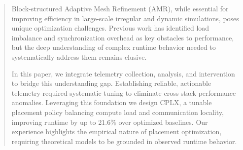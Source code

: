 
\begin{abstract}


  Block-structured Adaptive Mesh Refinement (AMR), while essential for improving efficiency in
  large-scale irregular and dynamic simulations, poses unique optimization challenges.
  Previous work has identified load imbalance and synchronization overhead as key obstacles to
  performance, but the deep understanding of complex runtime behavior needed to systematically
  address them remains elusive.

  In this paper, we integrate telemetry collection, analysis, and intervention to bridge this
  understanding gap.
  Establishing reliable, actionable telemetry required systematic tuning to eliminate cross-stack
  performance anomalies.
  Leveraging this foundation we design CPLX, a tunable placement policy balancing compute load and
  communication locality, improving runtime by up to 21.6\% over optimized baselines.
  Our experience highlights the empirical nature of placement optimization, requiring theoretical
  models to be grounded in observed runtime behavior.

\end{abstract}

